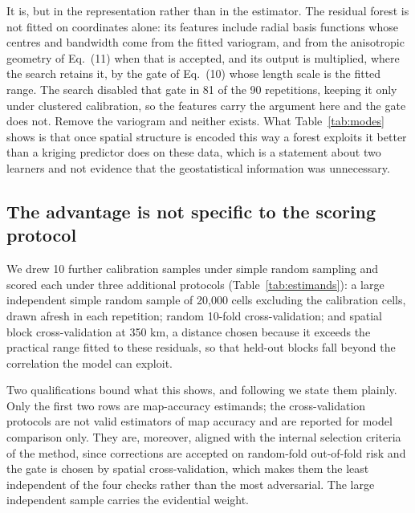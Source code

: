 \documentclass[preprint,12pt,authoryear]{elsarticle}
\newcommand{\Mgha}{Mg\,ha\textsuperscript{-1}}
\begin{document}
It is, but in the representation rather than in the estimator. The residual
forest is not fitted on coordinates alone: its features include radial basis
functions whose centres and bandwidth come from the fitted variogram, and from
the anisotropic geometry of Eq.~(11) when that is accepted, and its output is
multiplied, where the search retains it, by the gate of Eq.~(10) whose length
scale is the fitted range. The search disabled that gate in 81 of the 90
repetitions, keeping it only under clustered calibration, so the features carry
the argument here and the gate does not. Remove the variogram and neither
exists. What
Table~\ref{tab:modes} shows is that once spatial structure is encoded this way a
forest exploits it better than a kriging predictor does on these data, which is
a statement about two learners and not evidence that the geostatistical
information was unnecessary.

\subsection{The advantage is not specific to the scoring protocol}
\label{sec:protocols}

We drew 10 further calibration samples under simple random sampling and scored
each under three additional protocols (Table~\ref{tab:estimands}): a large
independent simple random sample of 20{,}000 cells excluding the calibration
cells, drawn afresh in each repetition; random 10-fold cross-validation; and spatial block
cross-validation at 350 km, a distance chosen because it exceeds the practical
range fitted to these residuals, so that held-out blocks fall beyond the
correlation the model can exploit.

Two qualifications bound what this shows, and following \citet{wadoux2021} we
state them plainly. Only the first two rows are map-accuracy estimands; the
cross-validation protocols are not valid estimators of map accuracy and are
reported for model comparison only. They are, moreover, aligned with the
internal selection criteria of the method, since corrections are accepted on
random-fold out-of-fold risk and the gate is chosen by spatial
cross-validation, which makes them the least independent of the four checks
rather than the most adversarial. The large independent sample carries the
evidential weight.

\begin{table}[!ht]
\centering
\caption{Comparison against the untuned default forest under four estimands,
simple random calibration design. RMSE in \Mgha{}.}
\label{tab:estimands}
\small

\end{table}
\end{document}
